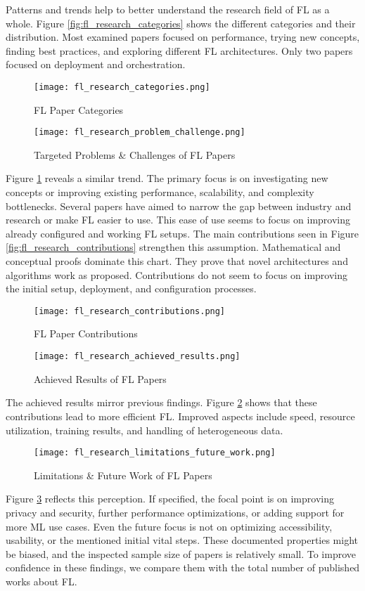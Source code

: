 Patterns and trends help to better understand the research field of FL as a whole.
Figure \ref{fig:fl_research_categories} shows the different categories and their distribution.
Most examined papers focused on performance, trying new concepts, finding best practices, and exploring different FL architectures.
Only two papers focused on deployment and orchestration.
\begin{figure}[p]
    \centering
    \texttt{[image: fl\_research\_categories.png]}
    \caption{FL Paper Categories}
    \label{fig:fl_research_categories}

    \texttt{[image: fl\_research\_problem\_challenge.png]}
    \caption{Targeted Problems \& Challenges of FL Papers}
    \label{fig:fl_research_problem_challenge}
\end{figure}
Figure \ref{fig:fl_research_problem_challenge} reveals a similar trend.
The primary focus is on investigating new concepts or improving existing performance, scalability, and complexity bottlenecks.
Several papers have aimed to narrow the gap between industry and research or make FL easier to use.
This ease of use seems to focus on improving already configured and working FL setups.
The main contributions seen in Figure \ref{fig:fl_research_contributions} strengthen this assumption.
Mathematical and conceptual proofs dominate this chart.
They prove that novel architectures and algorithms work as proposed.
Contributions do not seem to focus on improving the initial setup, deployment, and configuration processes.

\begin{figure}[p]
    \centering
    \texttt{[image: fl\_research\_contributions.png]}
    \caption{FL Paper Contributions}
    \label{fig:fl_research_contributions}

    \texttt{[image: fl\_research\_achieved\_results.png]}
    \caption{Achieved Results of FL Papers}
    \label{fig:fl_research_achieved_results}
\end{figure}
The achieved results mirror previous findings.
Figure \ref{fig:fl_research_achieved_results} shows that these contributions lead to more efficient FL.
Improved aspects include speed, resource utilization, training results, and handling of heterogeneous data.
\begin{figure}[h]
    \centering
    \texttt{[image: fl\_research\_limitations\_future\_work.png]}
    \caption{Limitations \& Future Work of FL Papers}
    \label{fig:fl_research_limitations_future_work}
\end{figure}
Figure \ref{fig:fl_research_limitations_future_work} reflects this perception.
If specified, the focal point is on improving privacy and security, further performance optimizations, or adding support for more ML use cases.
Even the future focus is not on optimizing accessibility, usability, or the mentioned initial vital steps.
These documented properties might be biased, and the inspected sample size of papers is relatively small.
To improve confidence in these findings, we compare them with the total number of published works about FL.

